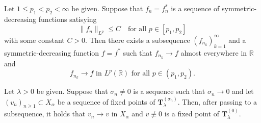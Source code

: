 \documentclass[10pt,a4paper]{amsart}
\newcommand{\R}{\mathbb{R}}
\newcommand{\Ts}{\mathbf{T}}
\renewcommand{\geq}{\geqslant}
\renewcommand{\leq}{\leqslant}
\begin{document}
\begin{lem} \label{lem:helly}
Let $1 \leq p_1 < p_2 < \infty$ be given. Suppose that $f_n=f_n^*$ is a sequence of symmetric-decreasing functions satisying
$$
\| f_n \|_{L^p} \leq C \quad \mbox{for all $p \in [p_1, p_2]$}
$$ 
with some constant $C>0$. Then there exists a subsequence $(f_{n_k})_{k=1}^\infty$ and a symmetric-decreasing function $f=f^*$ such that $f_{n_k} \to f$ almost everywhere in $\R$ and
$$
\mbox{$f_{n_k} \to f$ in $L^p(\R)$ for all $p \in (p_1, p_2)$}.
$$
\end{lem}

\begin{lem} \label{lem:nice}
Let $\lambda > 0$ be given. Suppose that $\sigma_n \neq 0$ is a sequence such that $\sigma_n \to 0$ and let $(v_n)_{n \geq 1} \subset X_\alpha$ be a sequence of fixed points of $\Ts_{\lambda}^{(\sigma_n)}$. Then, after passing to a subsequence, it holds that $v_{n} \to v$ in $X_\alpha$ and $v \not \equiv 0$ is a fixed point of $\Ts_{\lambda}^{(0)}$.
\end{lem}
\end{document}
